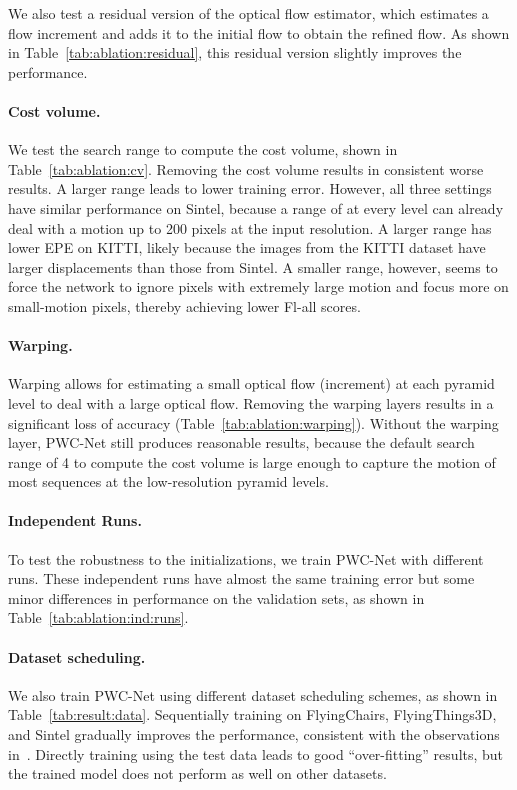 \documentclass[10pt,journal,cspaper,compsoc]{IEEEtran}
\newcommand{\beforePara}{\vspace{-0em}}
\begin{document}
	We also test a residual version of the optical flow estimator, which estimates a flow increment and adds it to the initial flow to obtain the refined flow. As shown in Table~\ref{tab:ablation:residual}, this residual version slightly improves the performance. 

	\beforePara
	\paragraph{Cost volume.}
	We test the search range to compute the cost volume, shown in Table~\ref{tab:ablation:cv}. Removing the cost volume results in consistent worse results. A larger range leads to lower training error. However, all three settings have similar performance on Sintel, because a range of  at every level can already deal with a motion up to 200 pixels at the input resolution. A larger range has lower EPE on KITTI, likely because the images from the KITTI dataset have larger displacements than those from Sintel. A smaller range, however, seems to force the network to ignore pixels with extremely large motion and focus more on small-motion pixels, thereby achieving lower Fl-all scores.
	
	
	\beforePara
	\paragraph{Warping.}
	Warping allows for estimating a small optical flow (increment) at each pyramid level to deal with a large optical flow. Removing the warping layers results in a significant loss of accuracy (Table~\ref{tab:ablation:warping}). Without the warping layer, PWC-Net still produces reasonable results, because the default search range of 4 to compute the cost volume is large enough to capture the motion of most sequences at the low-resolution pyramid levels. 
	
	\beforePara
	\paragraph{Independent Runs.}
    To test the robustness to the initializations, we train PWC-Net with different runs.  These independent runs have almost the same training error but some minor differences in performance on the validation sets, as shown in Table~\ref{tab:ablation:ind:runs}. 
	
	\beforePara
	\paragraph{Dataset scheduling.}
	We also train PWC-Net using different dataset scheduling schemes, as shown in Table~\ref{tab:result:data}. Sequentially training on FlyingChairs, FlyingThings3D, and Sintel gradually improves the performance, consistent with the observations in~\cite{Ilg:2016:Flownet2}. Directly training using the test data leads to good ``over-fitting'' results, but the trained model does not perform as well on other datasets. 
	
\end{document}
